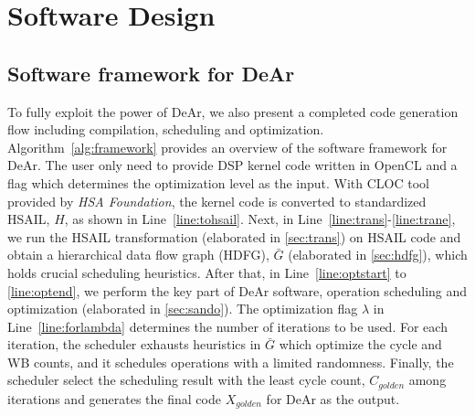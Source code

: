     \section{Software Design}
        \subsection{Software framework for DeAr}
            To fully exploit the power of DeAr, we also present a completed code generation flow including compilation, scheduling and optimization.
            Algorithm~\ref{alg:framework} provides an overview of the software framework for DeAr. 
            The user only need to provide DSP kernel code written in OpenCL and a flag which determines the optimization level as the input.
            With CLOC \cite{cloc} tool provided by \textit{HSA Foundation}, the kernel code is converted to standardized HSAIL, $H$, as shown in Line~\ref{line:tohsail}.
            Next, in Line~\ref{line:trans}-\ref{line:trane}, 
            we run the HSAIL transformation (elaborated in \ref{sec:trans}) on HSAIL code and obtain a hierarchical data flow graph (HDFG), 
            $\bar{G}$ (elaborated in \ref{sec:hdfg}), which holds crucial scheduling heuristics.
            After that, in Line~\ref{line:optstart} to \ref{line:optend}, we perform the key part of DeAr software, 
            operation scheduling and optimization (elaborated in \ref{sec:sando}).
            The optimization flag $\lambda$ in Line~\ref{line:forlambda} determines the number of iterations to be used.
            For each iteration, the scheduler exhausts heuristics in $\bar{G}$ which optimize the cycle and WB counts, 
            and it schedules operations with a limited randomness.
            Finally, the scheduler select the scheduling result with the least cycle count, 
            $C_{golden}$ among iterations and generates the final code $X_{golden}$ for DeAr as the output.
